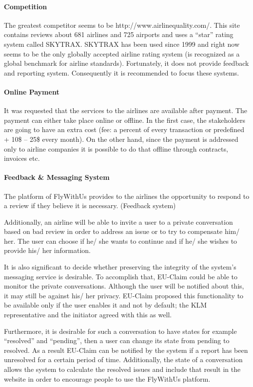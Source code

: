 \documentclass{article}
\begin{document}
\paragraph{Competition} The greatest competitor seems to be http://www.airlinequality.com/. This site contains reviews about 681 airlines and 725 airports and uses a “star” rating 
system called SKYTRAX. SKYTRAX has been used since 1999 and right now seems to be the only globally accepted airline rating system (is recognized as a global benchmark for airline 
standards). Fortunately, it does not provide feedback and reporting system. Consequently it is recommended to focus these systems.

\paragraph{Online Payment} It was requested that the services to the airlines are available after payment. The payment can either take place online or offline. In the first case, 
the stakeholders are going to have an extra cost (fee: a percent of every transaction or predefined + 10\$ – 25\$ every month). On the other hand, since the 
payment is addressed only to airline companies it is possible to do that offline through contracts, invoices etc.

\paragraph{Feedback \& Messaging System} The platform of FlyWithUs provides to the airlines the opportunity to respond to a review if they believe it is necessary. (Feedback system)

Additionally, an airline will be able to invite a user to a private conversation based on bad review in order to address an issue or to try to compensate him/ her. The user can choose 
if he/ she wants to continue and if he/ she wishes to provide his/ her information.

It is also significant to decide whether preserving the integrity of the system's  messaging service is desirable. To accomplish that, EU-Claim could be able to monitor the private 
conversations. Although the user will be notified about this, it may still be against his/ her privacy. EU-Claim proposed this functionality to be available only if the user enables 
it and not by default; the KLM representative and the initiator agreed with this as well.

Furthermore, it is desirable for such a conversation to have states for example “resolved”  and “pending”, then a user can change its state from pending to resolved. As a result 
EU-Claim can be notified by the system if a report has been unresolved for a certain period of time.  Additionally, the state of a conversation allows the system to calculate the resolved 
issues and include that result in the website in order to encourage people to use the FlyWithUs platform.
\end{document}
